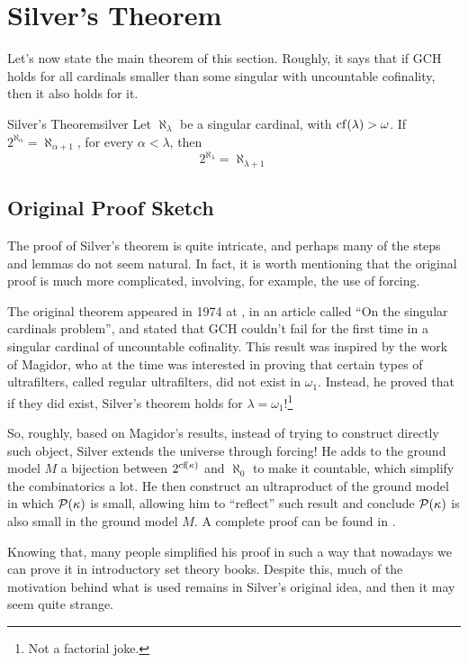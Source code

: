 \section{Silver's Theorem}

Let's now state the main theorem of this section. Roughly, it says that if GCH holds for all cardinals smaller than some singular with uncountable cofinality, then it also holds for it.

\begin{theorem}{Silver's Theorem}{silver}
    Let $\aleph_\lambda$ be a singular cardinal, with $\mathrm{cf}\!\left(\lambda\right)>\omega$. If $2^{\aleph_\alpha}=\aleph_{\alpha+1}$, for every $\alpha<\lambda$, then
    $$2^{\aleph_\lambda}=\aleph_{\lambda+1}$$
\end{theorem}

\subsection{Original Proof Sketch}

The proof of Silver's theorem is quite intricate, and perhaps many of the steps and lemmas do not seem natural. In fact, it is worth mentioning that the original proof is much more complicated, involving, for example, the use of forcing.

The original theorem appeared in 1974 at \cite{bib:silver}, in an article called ``On the singular cardinals problem'', and stated that GCH couldn't fail for the first time in a singular cardinal of uncountable cofinality. This result was inspired by the work of Magidor, who at the time was interested in proving that certain types of ultrafilters, called regular ultrafilters, did not exist in $\omega_1$. Instead, he proved that if they did exist, Silver's theorem holds for $\lambda=\omega_1$!\footnote{Not a factorial joke.}

So, roughly, based on Magidor's results, instead of trying to construct directly such object, Silver extends the universe through forcing! He adds to the ground model $M$ a bijection between $2^{\mathrm{cf}\!\left(\kappa\right)}$ and $\aleph_0$ to make it countable, which simplify the combinatorics a lot. He then construct an ultraproduct of the ground model in which $\mathcal{P}(\kappa)$ is small, allowing him to ``reflect'' such result and conclude $\mathcal{P}(\kappa)$ is also small in the ground model $M$. A complete proof can be found in \cite{bib:gallart}.

Knowing that, many people simplified his proof in such a way that nowadays we can prove it in introductory set theory books. Despite this, much of the motivation behind what is used remains in Silver's original idea, and then it may seem quite strange.


